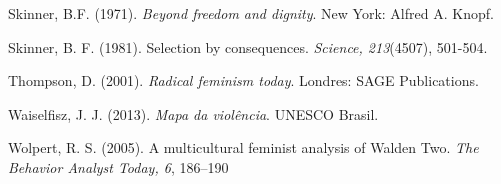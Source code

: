 \hangindent=25pt
\noindent Skinner, B.F. (1971). \textit{Beyond freedom and dignity}. New York: Alfred A. Knopf.

\hangindent=25pt
\noindent Skinner, B. F. (1981). Selection by consequences. \textit{Science, 213}(4507), 501-504.

\hangindent=25pt
\noindent Thompson, D. (2001). \textit{Radical feminism today}. Londres: SAGE Publications.

\hangindent=25pt
\noindent Waiselfisz, J. J. (2013). \textit{Mapa da violência}. UNESCO Brasil.

\hangindent=25pt
\noindent Wolpert, R. S. (2005). A multicultural feminist analysis of Walden Two. \textit{The Behavior Analyst Today, 6}, 186–190